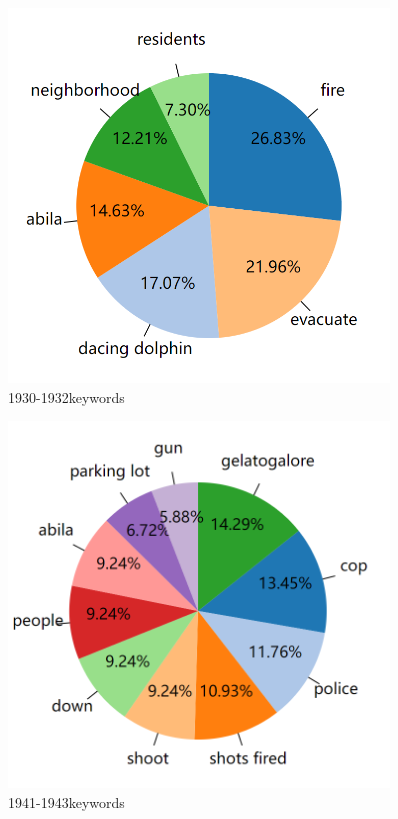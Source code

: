 \documentclass[a4paper]{article}
\begin{document}
\begin{figure}[H]
    \centering
    \includegraphics[width=0.9\textwidth]{images/3-6.png}
    \caption{1930-1932keywords}\label{fig:3-6}
    \vspace{\baselineskip}
\end{figure}

\begin{figure}[H]
    \centering
    \includegraphics[width=0.9\textwidth]{images/3-7.png}
    \caption{1941-1943keywords}\label{fig:3-7}
    \vspace{\baselineskip}
\end{figure}
    
\end{document}
